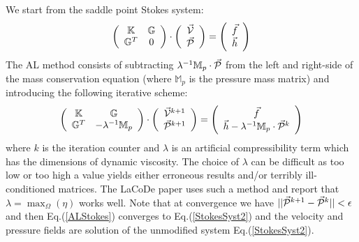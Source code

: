 We start from the saddle point Stokes system:
\begin{equation}
\left(
\begin{array}{cc}
{\mathbb{K}} & {\mathbb{G}} \\ {\mathbb{G}}^T & 0 
\end{array}
\right)
\cdot
\left(
\begin{array}{c}
\vec{\cal V} \\ \vec{\cal P}
\end{array}
\right)
=
\left(
\begin{array}{c}
\vec{f} \\ \vec{h}
\end{array}
\right)
\label{StokesSyst2}
\end{equation}
The AL method consists of subtracting $\lambda^{-1} \mathbb{M}_p \cdot \vec{\cal P}$ from the left and 
right-side of the mass conservation equation (where $\mathbb{M}_p$ is the pressure mass matrix) 
and introducing the following iterative scheme:
\begin{equation}
\left(
\begin{array}{cc}
{\mathbb{K}} & {\mathbb{G}} \\ {\mathbb{G}}^T & -\lambda^{-1} \mathbb{M}_p
\end{array}
\right)
\cdot
\left(
\begin{array}{c}
\vec{\cal V}^{k+1} \\ \vec{\cal P}^{k+1}
\end{array}
\right)
=
\left(
\begin{array}{c}
\vec{f} \\ \vec{h} - \lambda^{-1} \mathbb{M}_p \cdot \vec{\cal P}^k
\end{array}
\right)
\label{ALStokes}
\end{equation}
where $k$ is the iteration counter and $\lambda$ is an artificial compressibility term which has 
the dimensions of dynamic viscosity. 
The choice of $\lambda$ can be difficult as too low or too high a value yields either erroneous results and/or terribly ill-conditioned matrices. The LaCoDe paper \cite{demh19} uses such a method and report 
that $\lambda=\max_\Omega({\eta})$ works well. 
Note that at convergence we have $||\vec{\cal P}^{k+1}-\vec{\cal P}^k||<\epsilon$ and then Eq.(\ref{ALStokes}) converges to Eq.(\ref{StokesSyst2}) and the velocity and pressure fields are solution of the unmodified system Eq.(\ref{StokesSyst2}).

